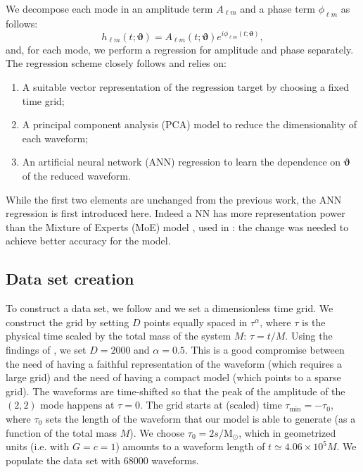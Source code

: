 \documentclass[twocolumn,showpacs,preprintnumbers,nofootinbib,prd,
superscriptaddress,10pt]{revtex4-2}
\begin{document}
We decompose each mode in an amplitude term $A_{\ell m}$ and a phase term $\phi_{\ell m}$ as follows:
\begin{equation}\label{eq:amp_ph_decomposition}
	h_{\ell m}(t; \boldsymbol{\vartheta}) = A_{\ell m}(t; \boldsymbol{\vartheta}) e^{i \phi_{\ell m}(t; \boldsymbol{\vartheta})},
\end{equation}
and, for each mode, we perform a regression for amplitude and phase separately. The regression scheme closely follows \cite{Schmidt:2020yuu} and relies on:
\begin{enumerate}[label=(\alph*)]
	\item A suitable vector representation of the regression target by choosing a fixed time grid;
	\item A principal component analysis (PCA) model to reduce the dimensionality of each waveform;
	\item An artificial neural network (ANN) regression to learn the dependence on $\boldsymbol{\vartheta}$ of the 
	reduced waveform.
\end{enumerate}

While the first two elements are unchanged from the previous work, the ANN regression is first introduced here. Indeed a NN has more representation power than the Mixture of Experts (MoE) model \cite{Jacobs1991AdaptiveMoE}, used in \cite{Schmidt:2020yuu}: the change was needed to achieve better accuracy for the model.

\subsection{Data set creation}
\label{sec:dataset_creation}

To construct a data set, we follow \cite{Schmidt:2020yuu} and we set a dimensionless time grid. We construct the grid 
by setting $D$ points equally spaced in $\tau^\alpha$, where $\tau$ is the physical time scaled by the total mass of 
the system $M$: $\tau = t/M$. Using the findings of \cite{Schmidt:2020yuu}, we set $D = \text{2000}$ and 
$\alpha = \text{0.5}$.
%
This is a good compromise between the need of having a faithful representation of the waveform (which requires a large grid) and the need of having a compact model (which points to a sparse grid).
%
The waveforms are time-shifted so that the peak of the amplitude of the $(2,2)$ mode happens at $\tau=0$. The grid starts at (scaled) time $\tau_\text{min} = -\tau_0$, where $\tau_0$ sets the length of the waveform that our model is able to generate (as a function of the total mass $M$).
We choose $\tau_0 = 2 s/\textrm{M}_\odot$, which in geometrized units (i.e. with $G=c=1$) amounts to a waveform length of $t \simeq 4.06\times 10^5 M$.
We populate the data set with $68000$ waveforms.
\end{document}
